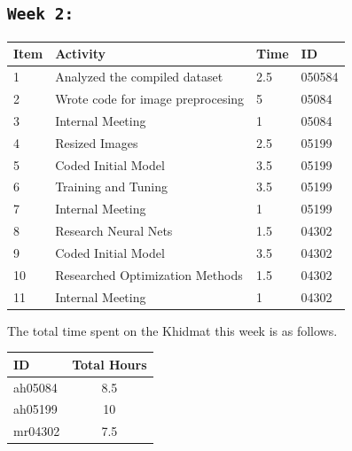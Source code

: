 \documentclass[11pt]{article}
\begin{document}
\subsection{\texttt{Week 2: }}
\begin{center}
\begin{tabular}{|l|l|l|l|}
  \hline
  \textbf{Item} 	& \textbf{Activity} & \textbf{Time} & \textbf{ID} \\\hline
  1 & Analyzed the compiled dataset & 2.5 & 050584 \\ \hline
  2 & Wrote code for image preprocesing & 5 & 05084 \\ \hline
  3 & Internal Meeting & 1 & 05084 \\ \hline
  4 & Resized Images & 2.5 & 05199  \\ \hline
  5 & Coded Initial Model & 3.5 & 05199 \\ \hline 
  6 & Training and Tuning & 3.5 & 05199 \\ \hline
  7 & Internal Meeting & 1 & 05199 \\ \hline
  8 & Research Neural Nets & 1.5 & 04302 \\ \hline
  9 & Coded Initial Model & 3.5 & 04302 \\ \hline
  10 & Researched Optimization Methods & 1.5 & 04302 \\ \hline
  11 & Internal Meeting & 1 & 04302 \\ \hline
\end{tabular}
    
\end{center}
The total time spent on the Khidmat this week is as follows.    

\begin{center}
\begin{tabular}{|l|c|}
  \hline
  \textbf{ID} & \textbf{Total Hours}\\\hline
  ah05084 & 8.5 \\\hline
  ah05199 & 10 \\\hline
  mr04302 & 7.5 \\\hline
\end{tabular}
\end{center}
\end{document}
